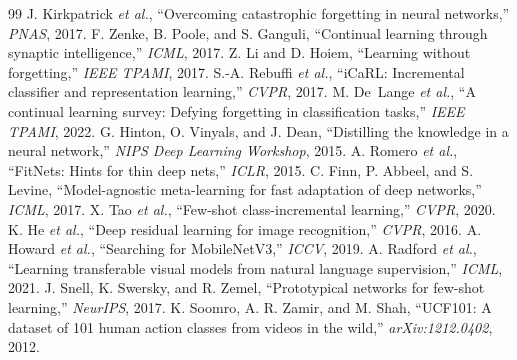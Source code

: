 \documentclass[conference]{IEEEtran}
\begin{document}
\begin{thebibliography}{99}
 J. Kirkpatrick \emph{et al.}, ``Overcoming catastrophic
forgetting in neural networks,'' \emph{PNAS}, 2017.
 F. Zenke, B. Poole, and S. Ganguli, ``Continual learning through
synaptic intelligence,'' \emph{ICML}, 2017.
 Z. Li and D. Hoiem, ``Learning without forgetting,'' \emph{IEEE
TPAMI}, 2017.
 S.-A. Rebuffi \emph{et al.}, ``iCaRL: Incremental classifier
and representation learning,'' \emph{CVPR}, 2017.
 M. De~Lange \emph{et al.}, ``A continual learning survey:
Defying forgetting in classification tasks,'' \emph{IEEE TPAMI}, 2022.
 G. Hinton, O. Vinyals, and J. Dean, ``Distilling the knowledge in a
neural network,'' \emph{NIPS Deep Learning Workshop}, 2015.
 A. Romero \emph{et al.}, ``FitNets: Hints for thin deep
nets,'' \emph{ICLR}, 2015.
 C. Finn, P. Abbeel, and S. Levine, ``Model-agnostic meta-learning
for fast adaptation of deep networks,'' \emph{ICML}, 2017.
 X. Tao \emph{et al.}, ``Few-shot class-incremental learning,''
\emph{CVPR}, 2020.
 K. He \emph{et al.}, ``Deep residual learning for image
recognition,'' \emph{CVPR}, 2016.
 A. Howard \emph{et al.}, ``Searching for MobileNetV3,''
\emph{ICCV}, 2019.
 A. Radford \emph{et al.}, ``Learning transferable visual models from
natural language supervision,'' \emph{ICML}, 2021.
 J. Snell, K. Swersky, and R. Zemel, ``Prototypical networks for
few-shot learning,'' \emph{NeurIPS}, 2017.
 K. Soomro, A. R. Zamir, and M. Shah, ``UCF101: A dataset of 101
human action classes from videos in the wild,'' \emph{arXiv:1212.0402}, 2012.
\end{thebibliography}
\end{document}
